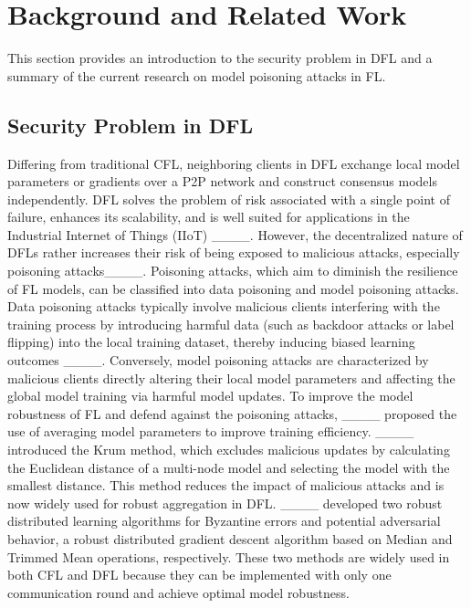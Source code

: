 \section{Background and Related Work}
This section provides an introduction to the security problem in DFL and a summary of the current research on model poisoning attacks in FL.
\subsection{Security Problem in DFL}
Differing from traditional CFL, neighboring clients in DFL exchange local model parameters or gradients over a P2P network and construct consensus models independently. DFL solves the problem of risk associated with a single point of failure, enhances its scalability, and is well suited for applications in the Industrial Internet of Things (IIoT) ____. However, the decentralized nature of DFLs rather increases their risk of being exposed to malicious attacks, especially poisoning attacks____. Poisoning attacks, which aim to diminish the resilience of FL models, can be classified into data poisoning and model poisoning attacks. Data poisoning attacks typically involve malicious clients interfering with the training process by introducing harmful data (such as backdoor attacks or label flipping) into the local training dataset, thereby inducing biased learning outcomes ____. Conversely, model poisoning attacks are characterized by malicious clients directly altering their local model parameters and affecting the global model training via harmful model updates. To improve the model robustness of FL and defend against the poisoning attacks, ____ proposed the use of averaging model parameters to improve training efficiency. ____ introduced the Krum method, which excludes malicious updates by calculating the Euclidean distance of a multi-node model and selecting the model with the smallest distance. This method reduces the impact of malicious attacks and is now widely used for robust aggregation in DFL.
____ developed two robust distributed learning algorithms for Byzantine errors and potential adversarial behavior, a robust distributed gradient descent algorithm based on Median and Trimmed Mean operations, respectively. These two methods are widely used in both CFL and DFL because they can be implemented with only one communication round and achieve optimal model robustness.

